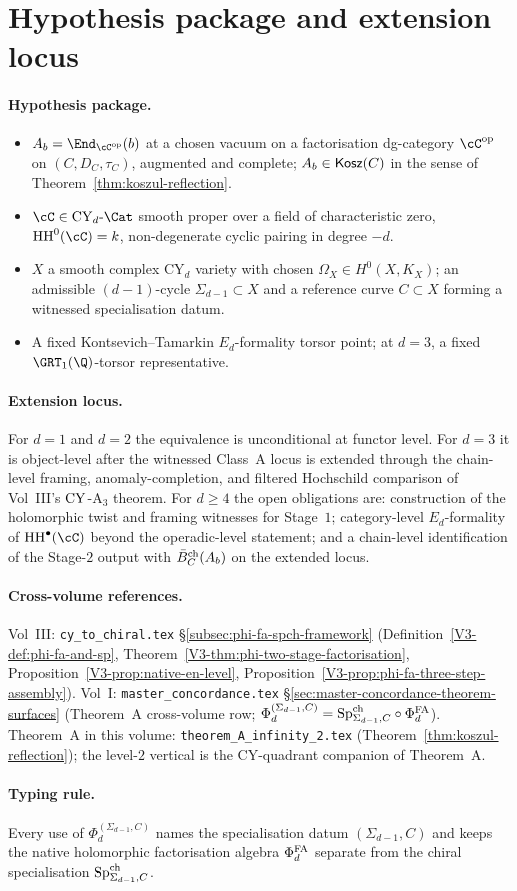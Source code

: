 \section{Hypothesis package and extension locus}
\label{sec:vert-level-2-hypothesis}

\paragraph{Hypothesis package.}
\begin{itemize}
 \item[(\textsc{Open})] $A_b=\End_{\cC^{\mathrm{op}}}(b)$ at a chosen
 vacuum on a factorisation dg-category $\cC^{\mathrm{op}}$ on
 $(C,D_C,\tau_C)$, augmented and complete; $A_b\in\mathsf{Kosz}(C)$ in the
 sense of Theorem~\ref{thm:koszul-reflection}.
 \item[(\textsc{CY})] $\cC\in\CY_d\text{-}\Cat$ smooth proper over a
 field of characteristic zero, $\HH^0(\cC)=k$, non-degenerate cyclic
 pairing in degree $-d$.
 \item[(\textsc{Datum})] $X$ a smooth complex CY$_d$ variety with chosen
 $\Omega_X\in H^0(X,K_X)$; an admissible $(d{-}1)$-cycle
 $\Sigma_{d-1}\subset X$ and a reference curve $C\subset X$ forming a
 witnessed specialisation datum.
 \item[(\textsc{Formality})] A fixed Kontsevich--Tamarkin
 $E_d$-formality torsor point; at $d=3$, a fixed
 $\GRT_1(\Q)$-torsor representative.
\end{itemize}

\paragraph{Extension locus.}
For $d=1$ and $d=2$ the equivalence is unconditional at functor level.
For $d=3$ it is object-level after the witnessed Class~A locus is
extended through the chain-level framing, anomaly-completion, and
filtered Hochschild comparison of Vol~III's $\mathrm{CY}$-A$_3$ theorem. For
$d\geq 4$ the open obligations are: construction of the holomorphic
twist and framing witnesses for Stage~$1$; category-level $E_d$-formality
of $\HH^\bullet(\cC)$ beyond the operadic-level statement; and a
chain-level identification of the Stage-$2$ output with $\bar{B}^{\mathrm{ch}}_C(A_b)$
on the extended locus.

\paragraph{Cross-volume references.}
Vol~III: \texttt{cy\_to\_chiral.tex} \S\ref{subsec:phi-fa-spch-framework}
(Definition~\ref{V3-def:phi-fa-and-sp},
Theorem~\ref{V3-thm:phi-two-stage-factorisation},
Proposition~\ref{V3-prop:native-en-level},
Proposition~\ref{V3-prop:phi-fa-three-step-assembly}).
Vol~I: \texttt{master\_concordance.tex} \S\ref{sec:master-concordance-theorem-surfaces}
(Theorem~A cross-volume row;
$\Phi_d^{(\Sigma_{d-1},C)}=\mathrm{Sp}^{\mathrm{ch}}_{\Sigma_{d-1},C}\circ\Phi^{\mathrm{FA}}_d$).
Theorem~A in this volume:
\texttt{theorem\_A\_infinity\_2.tex}
(Theorem~\ref{thm:koszul-reflection}); the level-$2$ vertical is the
CY-quadrant companion of Theorem~A.

\paragraph{Typing rule.}
Every use of $\Phi_d^{(\Sigma_{d-1},C)}$ names the specialisation datum
$(\Sigma_{d-1},C)$ and keeps the native holomorphic factorisation
algebra $\Phi^{\mathrm{FA}}_d$ separate from the chiral specialisation
$\mathrm{Sp}^{\mathrm{ch}}_{\Sigma_{d-1},C}$.
